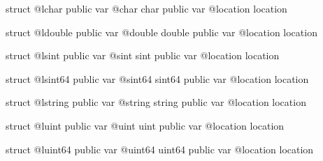 
\begin{galgas34}
struct @lchar {
  public var @char char
  public var @location location
}
\end{galgas34}



\begin{galgas34}
struct @ldouble {
  public var @double double
  public var @location location
}
\end{galgas34}








\begin{galgas34}
struct @lsint {
  public var @sint sint
  public var @location location
}
\end{galgas34}









\begin{galgas34}
struct @lsint64 {
  public var @sint64 sint64
  public var @location location
}
\end{galgas34}








\begin{galgas34}
struct @lstring {
  public var @string string
  public var @location location
}
\end{galgas34}








\begin{galgas34}
struct @luint {
  public var @uint uint
  public var @location location
}
\end{galgas34}







\begin{galgas34}
struct @luint64 {
  public var @uint64 uint64
  public var @location location
}
\end{galgas34}


